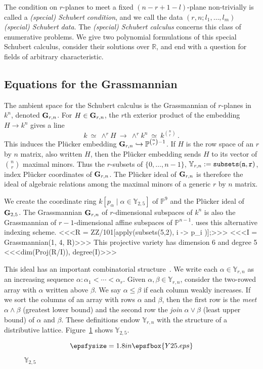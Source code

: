The condition on $r$-planes to meet a fixed $(n{-}r{+}1{-}l)$-plane
non-trivially is called a {\it (special) Schubert condition}, and we call 
the data $(r,n;l_1,\ldots,l_m)$ {\it (special) Schubert data}.
The {\it (special) Schubert calculus} concerns this class of enumerative
problems.
We give two polynomial formulations of this special Schubert calculus,
consider their solutions over ${\mathbb R}$, and end with a question for
fields of arbitrary characteristic.

\subsection{Equations for the Grassmannian}\label{sec:grass}
The ambient space for the Schubert calculus is the
Grassmannian  
of $r$-planes in $k^n$, denoted ${\bf G}_{r,n}$.
For $H\in{\bf G}_{r,n}$, the $r$th exterior product of the embedding 
$H \rightarrow k^n$ gives a line
$$
  k\ \simeq\ \wedge^r H\ \longrightarrow\ \wedge^r k^{n}\ \simeq\ 
  k^{\binom{n}{r}}\,.
$$
This induces the Pl\"ucker embedding  
${\bf G}_{r,n}\hookrightarrow{\mathbb P}^{\binom{n}{r}-1}$.
If $H$ is the row space of an $r$ by $n$ matrix, also written $H$, then the 
Pl\"ucker embedding sends $H$ to its vector of $\binom{n}{r}$ maximal
minors.
Thus the $r$-subsets of $\{0,\ldots,n{-}1\}$, 
${\mathbb Y}_{r,n}:={\tt subsets(n,r)}$,  
index Pl\"ucker coordinates of ${\bf G}_{r,n}$.
The Pl\"ucker ideal\index{Plucker ideal@Pl\"ucker ideal} of ${\bf G}_{r,n}$ is therefore the
ideal of algebraic relations among the maximal minors of a generic $r$ by $n$
matrix. 

We create the coordinate ring 
$k[p_\alpha\mid\alpha\in{\mathbb Y}_{2,5}]$ of ${\mathbb P}^9$ and the
Pl\"ucker ideal of ${\bf G}_{2,5}$.
The Grassmannian ${\bf G}_{r,n}$ of $r$-dimensional subspaces of $k^n$ is also
the Grassmannian of $r{-}1$-dimensional affine subspaces of 
${\mathbb P}^{n-1}$.
\Mtwo{} uses this alternative indexing scheme.
%
<<<R = ZZ/101[apply(subsets(5,2), i -> p_i )];>>>
%
<<<I = Grassmannian(1, 4, R)>>>
%
This projective variety has dimension 6 and degree 5
%
<<<dim(Proj(R/I)), degree(I)>>>
%

This ideal has an important combinatorial 
structure~\cite[Example 11.9]{SO:Sturmfels_GBCP}. 
We write each $\alpha\in{\mathbb Y}_{r,n}$ as an increasing
sequence $\alpha\colon\alpha_1<\cdots<\alpha_r$. 
Given $\alpha,\beta\in{\mathbb Y}_{r,n}$, consider the 
two-rowed array with $\alpha$ written above $\beta$.
We say $\alpha\leq \beta$ if each column weakly increases.
If we sort the columns of an array with rows $\alpha$ and
$\beta$, then the first row is the {\it meet} $\alpha\wedge\beta$ 
(greatest lower bound) and the
second row the {\it join} $\alpha\vee\beta$ (least upper bound) of $\alpha$
and $\beta$. 
These definitions endow ${\mathbb Y}_{r,n}$ with the structure of a
distributive lattice.
Figure~\ref{fig2} shows ${\mathbb Y}_{2,5}$.
\begin{figure}
$$
 \epsfysize=1.8in \epsfbox{Y25.eps}
$$\caption{${\mathbb Y}_{2,5}$\label{fig2}}
\end{figure}

